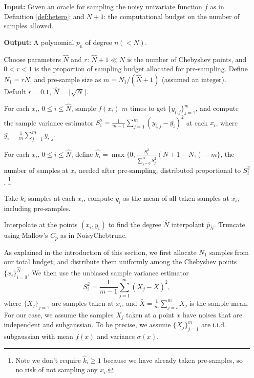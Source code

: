 \documentclass[pdflatex,sn-mathphys-num]{sn-jnl}%
\theoremstyle{thmstyleone}%
\theoremstyle{thmstyletwo}%
\theoremstyle{thmstylethree}%
\begin{document}
\begin{algorithm}
	\caption{HeteroChebtrunc for approximation of $f$ under unknown heteroskedastic noise.}\label{alg:noisychebtrununknown}
	\textbf{Input:} Given an oracle for sampling the noisy univariate function $f$ as in Definition \ref{def:hetero}; and $N+1$: the computational budget on the number of samples allowed.
	
	\textbf{Output:} A polynomial $p_n$ of degree $n( < N)$.
	\begin{algorithmic}[1]
		\item Choose parameters $\hat{N}$ and $r$: $\hat{N}+1 \ll N$ is the number of Chebyshev points, and $0< r< 1$ is the proportion of sampling budget allocated for pre-sampling. Define $N_1 = rN$, and pre-sample size as $m = N_1/(\hat{N}+1)$ (assumed an integer). Default $r=0.1$, $\hat{N} = \lfloor\sqrt{N}\rfloor$.
		\item For each $x_i$, $ 0\leq i \leq \hat{N}$, sample $f(x_i)$ $m$ times to get $\{y_{i,j}\}_{j=1}^m$, and compute the sample variance estimator $S_i^2 = \frac{1}{m-1} \sum_{j=1}^m(y_{i,j} - \bar{y_i})^2$ at each $x_i$, where $\bar{y_i} = \frac{1}{m}\sum_{j=1}^{m} y_{i,j}$. 
		\item For each $x_i$, $ 0\leq i \leq \hat{N}$, define $\hat{k_i} = \max\{0, \frac{S_i^2}{\sum_{j=0}^{\hat{N}}S^2_j}(N+1-N_1) -m\}$, the number of samples at $x_i$ needed after pre-sampling, distributed proportional to $S^2_i$. \footnote{Note we don't require $\hat{k}_i \geq 1$ because we have already taken pre-samples, so no risk of not sampling any $x_i$.}
		\item Take $k_i$ samples at each $x_i$, compute $y_i$ as the mean of all taken samples at $x_i$, including pre-samples. 
		\item Interpolate at the points $(x_i, y_i)$ to find the degree $\hat{N}$ interpolant $\hat{p}_{\hat{N}}$. Truncate using Mallow's $C_p$ as in NoisyChebtrunc. 
	\end{algorithmic}
\end{algorithm}

As explained in the introduction of this section, we first allocate $N_1$ samples from our total budget, and distribute them uniformly among the Chebyshev points $ \{x_i\}_{i=0}^{\hat{N}}$. We then use the unbiased sample variance estimator
\[S_i^2 = \frac{1}{m-1} \sum_{j=1}^{m} (X_j - \bar{X})^2,\]
where $\{X_j\}_{j=1}$ are samples taken at $x_i$, and $\bar{X} = \frac{1}{m}\sum_{j=i}^{m} X_j$ is the sample mean. For our case, we assume the samples $X_j$ taken at a point $x$ have noises that are independent and subgaussian. To be precise, we assume $\{X_j\}_{j=1}^m$ are i.i.d. subgaussian with mean $f(x) $ and variance $\sigma(x)$.
\end{document}
